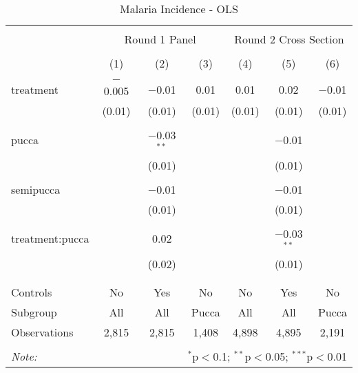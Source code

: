
\begin{table}[!htbp] \centering 
  \caption{Malaria Incidence - OLS} 
  \label{tbl:Malaria Incidence - OLS} 
\begin{tabular}{@{\extracolsep{5pt}}lcccccc} 
\\[-1.8ex]\hline 
\hline \\[-1.8ex] 
 & \multicolumn{3}{c}{Round 1 Panel} & \multicolumn{3}{c}{Round 2 Cross Section} \\ 
\\[-1.8ex] & (1) & (2) & (3) & (4) & (5) & (6)\\ 
\hline \\[-1.8ex] 
 treatment & $-$0.005 & $-$0.01 & 0.01 & 0.01 & 0.02 & $-$0.01 \\ 
  & (0.01) & (0.01) & (0.01) & (0.01) & (0.01) & (0.01) \\ 
  & & & & & & \\ 
 pucca &  & $-$0.03$^{**}$ &  &  & $-$0.01 &  \\ 
  &  & (0.01) &  &  & (0.01) &  \\ 
  & & & & & & \\ 
 semipucca &  & $-$0.01 &  &  & $-$0.01 &  \\ 
  &  & (0.01) &  &  & (0.01) &  \\ 
  & & & & & & \\ 
 treatment:pucca &  & 0.02 &  &  & $-$0.03$^{**}$ &  \\ 
  &  & (0.02) &  &  & (0.01) &  \\ 
  & & & & & & \\ 
\hline \\[-1.8ex] 
Controls & No & Yes & No & No & Yes & No \\ 
Subgroup & All & All & Pucca & All & All & Pucca \\ 
Observations & 2,815 & 2,815 & 1,408 & 4,898 & 4,895 & 2,191 \\ 
\hline 
\hline \\[-1.8ex] 
\textit{Note:}  & \multicolumn{6}{r}{$^{*}$p$<$0.1; $^{**}$p$<$0.05; $^{***}$p$<$0.01} \\ 
\end{tabular} 
\end{table} 
